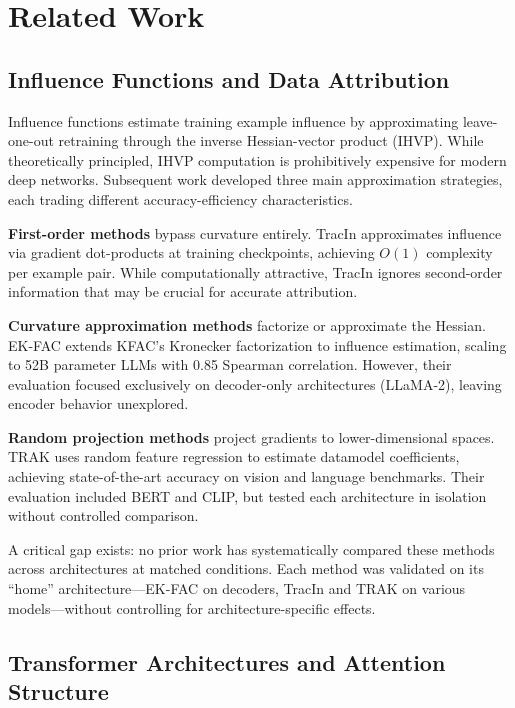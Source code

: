 \section{Related Work}

\subsection{Influence Functions and Data Attribution}

Influence functions \citep{koh2017understanding} estimate training example influence by approximating leave-one-out retraining through the inverse Hessian-vector product (IHVP). While theoretically principled, IHVP computation is prohibitively expensive for modern deep networks. Subsequent work developed three main approximation strategies, each trading different accuracy-efficiency characteristics.

\textbf{First-order methods} bypass curvature entirely. TracIn \citep{pruthi2020estimating} approximates influence via gradient dot-products at training checkpoints, achieving $O(1)$ complexity per example pair. While computationally attractive, TracIn ignores second-order information that may be crucial for accurate attribution.

\textbf{Curvature approximation methods} factorize or approximate the Hessian. EK-FAC \citep{grosse2023studying} extends KFAC's Kronecker factorization to influence estimation, scaling to 52B parameter LLMs with 0.85 Spearman correlation. However, their evaluation focused exclusively on decoder-only architectures (LLaMA-2), leaving encoder behavior unexplored.

\textbf{Random projection methods} project gradients to lower-dimensional spaces. TRAK \citep{park2023trak} uses random feature regression to estimate datamodel coefficients, achieving state-of-the-art accuracy on vision and language benchmarks. Their evaluation included BERT and CLIP, but tested each architecture in isolation without controlled comparison.

A critical gap exists: no prior work has systematically compared these methods across architectures at matched conditions. Each method was validated on its ``home'' architecture---EK-FAC on decoders, TracIn and TRAK on various models---without controlling for architecture-specific effects.

\subsection{Transformer Architectures and Attention Structure}

